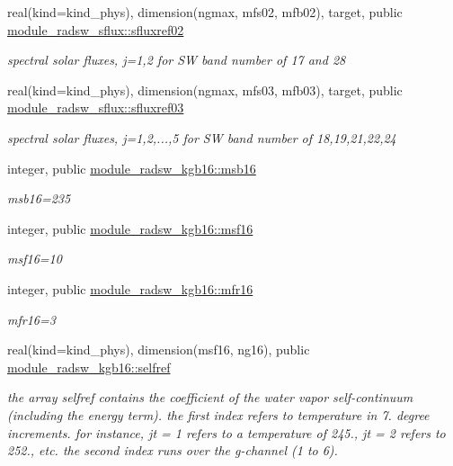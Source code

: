 \begin{Indent}
\begin{DoxyCompactItemize}
\mbox{\label{namespacemodule__radsw__sflux_aa57fca862289bd57327b9c3ef27e3e2f}} 
real(kind=kind\+\_\+phys), dimension(ngmax, mfs02, mfb02), target, public \hyperlink{namespacemodule__radsw__sflux_aa57fca862289bd57327b9c3ef27e3e2f}{module\+\_\+radsw\+\_\+sflux\+::sfluxref02}
\begin{DoxyCompactList}\small\item\em spectral solar fluxes, j=1,2 for SW band number of 17 and 28 \end{DoxyCompactList}\item 
\mbox{\label{namespacemodule__radsw__sflux_a95d2640cf0e6cf0ba4a8ca1758806e48}} 
real(kind=kind\+\_\+phys), dimension(ngmax, mfs03, mfb03), target, public \hyperlink{namespacemodule__radsw__sflux_a95d2640cf0e6cf0ba4a8ca1758806e48}{module\+\_\+radsw\+\_\+sflux\+::sfluxref03}
\begin{DoxyCompactList}\small\item\em spectral solar fluxes, j=1,2,...,5 for SW band number of 18,19,21,22,24 \end{DoxyCompactList}\item 
integer, public \hyperlink{group__module__radsw__kgbnn_ga2ce1ab36897fb1fc7d85cbf7fe539e59}{module\+\_\+radsw\+\_\+kgb16\+::msb16}
\begin{DoxyCompactList}\small\item\em msb16=235 \end{DoxyCompactList}\item 
integer, public \hyperlink{group__module__radsw__kgbnn_gab35df3f7d231e98fbef5738119138907}{module\+\_\+radsw\+\_\+kgb16\+::msf16}
\begin{DoxyCompactList}\small\item\em msf16=10 \end{DoxyCompactList}\item 
integer, public \hyperlink{group__module__radsw__kgbnn_gaeee3fe8e44f6fbd9a6a008bc9f97f37c}{module\+\_\+radsw\+\_\+kgb16\+::mfr16}
\begin{DoxyCompactList}\small\item\em mfr16=3 \end{DoxyCompactList}\item 
real(kind=kind\+\_\+phys), dimension(msf16, ng16), public \hyperlink{group__module__radsw__kgbnn_ga77d98f3fb766d4abfd494332ce67c2c2}{module\+\_\+radsw\+\_\+kgb16\+::selfref}
\begin{DoxyCompactList}\small\item\em the array selfref contains the coefficient of the water vapor self-\/continuum (including the energy term). the first index refers to temperature in 7. degree increments. for instance, jt = 1 refers to a temperature of 245., jt = 2 refers to 252., etc. the second index runs over the g-\/channel (1 to 6). \end{DoxyCompactList}\item 

\end{DoxyCompactItemize}
\end{Indent}
